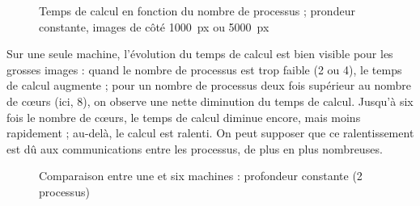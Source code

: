 \begin{figure}
  \centering


  \caption{Temps de calcul en fonction du nombre de processus ;
    prondeur constante, images de côté 1000~px ou 5000~px}
  \label{fig:mandel:stat:one-nproc}
\end{figure}

Sur une seule machine, l'évolution du temps de calcul est bien visible
pour les grosses images : quand le nombre de processus est trop faible
(2 ou 4), le temps de calcul augmente ; pour un nombre de processus
deux fois supérieur au nombre de cœurs (ici, 8), on observe une nette
diminution du temps de calcul. Jusqu'à six fois le nombre de cœurs, le
temps de calcul diminue encore, mais moins rapidement ; au-delà, le
calcul est ralenti. On peut supposer que ce ralentissement est dû aux
communications entre les processus, de plus en plus nombreuses.

\begin{figure}
  \centering


  \caption{Comparaison entre une et six machines : profondeur
    constante (2 processus)}
  \label{fig:mandel:stat:comp-un-six-taille}
\end{figure}

